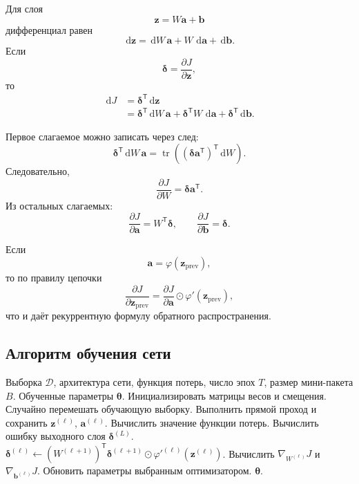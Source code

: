 \documentclass[12pt,a4paper]{article}
\theoremstyle{definition}
\newcommand{\T}{\mathsf{T}}
\newcommand{\1}{\mathbf{1}}
\newcommand{\dd}{\,\mathrm{d}}
\begin{document}
Для слоя
\[
    \bm{z}=W\bm{a}+\bm{b}
\]
дифференциал равен
\[
    \dd\bm{z}
    =
    \dd W\,\bm{a}
    +
    W\,\dd\bm{a}
    +
    \dd\bm{b}.
\]
Если
\[
    \bm{\delta}
    =
    \frac{\partial J}{\partial\bm{z}},
\]
то
\begin{align*}
    \dd J
    &=
    \bm{\delta}^{\T}\dd\bm{z}\\
    &=
    \bm{\delta}^{\T}\dd W\,\bm{a}
    +
    \bm{\delta}^{\T}W\,\dd\bm{a}
    +
    \bm{\delta}^{\T}\dd\bm{b}.
\end{align*}

Первое слагаемое можно записать через след:
\[
    \bm{\delta}^{\T}\dd W\,\bm{a}
    =
    \operatorname{tr}
    \left(
        (\bm{\delta}\bm{a}^{\T})^{\T}
        \dd W
    \right).
\]
Следовательно,
\[
    \frac{\partial J}{\partial W}
    =
    \bm{\delta}\bm{a}^{\T}.
\]
Из остальных слагаемых:
\[
    \frac{\partial J}{\partial\bm{a}}
    =
    W^{\T}\bm{\delta},
    \qquad
    \frac{\partial J}{\partial\bm{b}}
    =
    \bm{\delta}.
\]

Если
\[
    \bm{a}
    =
    \varphi(\bm{z}_{\mathrm{prev}}),
\]
то по правилу цепочки
\[
    \frac{\partial J}{\partial\bm{z}_{\mathrm{prev}}}
    =
    \frac{\partial J}{\partial\bm{a}}
    \odot
    \varphi'(\bm{z}_{\mathrm{prev}}),
\]
что и даёт рекуррентную формулу обратного распространения.

\subsection{Алгоритм обучения сети}

\begin{algorithm}[h]
\caption{Обучение нейронной сети методом обратного распространения}
\begin{algorithmic}[1]
\Require Выборка $\mathcal{D}$, архитектура сети, функция потерь,
число эпох $T$, размер мини-пакета $B$.
\Ensure Обученные параметры $\bm{\theta}$.
\State Инициализировать матрицы весов и смещения.
    \State Случайно перемешать обучающую выборку.
        \State Выполнить прямой проход и сохранить
        $\bm{z}^{(\ell)}$, $\bm{a}^{(\ell)}$.
        \State Вычислить значение функции потерь.
        \State Вычислить ошибку выходного слоя
        $\bm{\delta}^{(L)}$.
            \State
            $\bm{\delta}^{(\ell)}
            \gets
            (W^{(\ell+1)})^{\T}
            \bm{\delta}^{(\ell+1)}
            \odot
            \varphi'^{(\ell)}(\bm{z}^{(\ell)})$.
        \EndFor
            \State Вычислить
            $\nabla_{W^{(\ell)}}J$ и
            $\nabla_{\bm{b}^{(\ell)}}J$.
            \State Обновить параметры выбранным оптимизатором.
        \EndFor
    \EndFor
\EndFor
\State \Return $\bm{\theta}$.
\end{algorithmic}
\end{algorithm}
\end{document}
